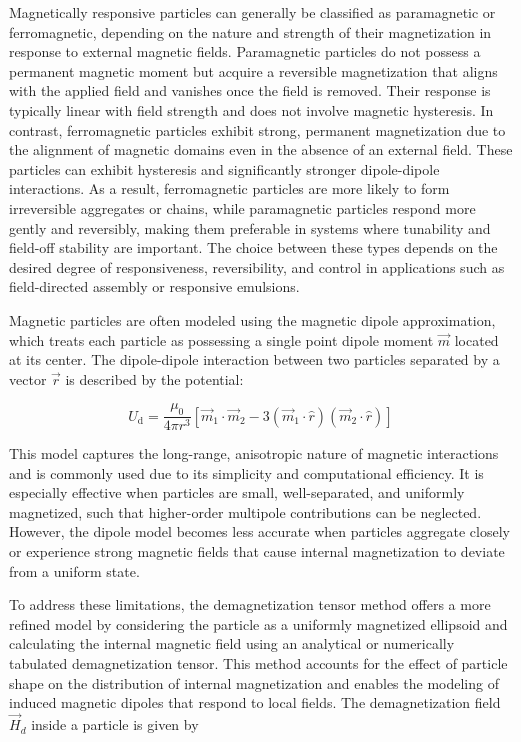 Magnetically responsive particles can generally be classified as paramagnetic or ferromagnetic, depending on the nature and strength of their magnetization in response to external 
magnetic fields. Paramagnetic particles do not possess a permanent magnetic moment but acquire a reversible magnetization that aligns with the applied field and 
vanishes once the field is removed. \cite{sinn_magnetically_2011} Their response is typically linear with field strength and does not involve magnetic hysteresis. 
In contrast, ferromagnetic particles exhibit strong, permanent magnetization due to the alignment of magnetic domains even in the absence of an external field. These particles can 
exhibit hysteresis and significantly stronger dipole-dipole interactions. \cite{sinn_magnetically_2011}
As a result, ferromagnetic particles are more likely to form irreversible aggregates or chains, while paramagnetic particles 
respond more gently and reversibly, making them preferable in systems where tunability and field-off stability are important. The choice between these types depends on the desired 
degree of responsiveness, reversibility, and control in applications such as field-directed assembly or responsive emulsions.

Magnetic particles are often modeled using the magnetic dipole approximation, which treats each particle as possessing a single point dipole moment \(\vec{m}\) located at its center.
\cite{davies_assembling_2014}
The dipole-dipole interaction between two particles separated by a vector \(\vec{r}\) is described by the potential:

\begin{equation}
    U_{\text{d}} = \frac{\mu_0}{4\pi r^3} \left[ \vec{m}_1 \cdot \vec{m}_2 - 3(\vec{m}_1 \cdot \hat{r})(\vec{m}_2 \cdot \hat{r}) \right]
\end{equation}

This model captures the long-range, anisotropic nature of magnetic interactions and is commonly used due to its simplicity and computational efficiency. It is especially effective when 
particles are small, well-separated, and uniformly magnetized, such that higher-order multipole contributions can be neglected. However, the dipole model becomes less accurate when particles 
aggregate closely or experience strong magnetic fields that cause internal magnetization to deviate from a uniform state.

To address these limitations, the demagnetization tensor method offers a more refined model by considering the particle as a uniformly magnetized ellipsoid and calculating the internal magnetic 
field using an analytical or numerically tabulated demagnetization tensor. \cite{takahashi_ellipsoids_2017} 
This method accounts for the effect of particle shape on the distribution of internal magnetization and enables the modeling of induced magnetic dipoles that respond to local fields. 
The demagnetization field \(\vec{H}_d\) inside a particle is given by

